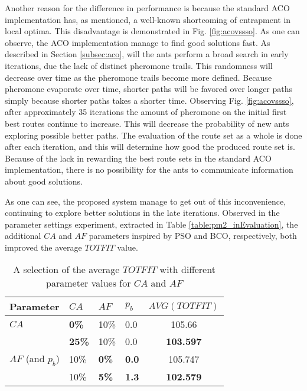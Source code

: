 Another reason for the difference in performance is because the standard ACO implementation has, as mentioned, a well-known shortcoming of entrapment in local optima. This disadvantage is demonstrated in Fig. \ref{fig:acovssso}. As one can observe, the ACO implementation manage to find good solutions fast. As described in Section \vref{subsec:aco}, will the ants perform a broad search in early iterations, due the lack of distinct pheromone trails. This randomness will decrease over time as the pheromone trails become more defined. Because pheromone evaporate over time, shorter paths will be favored over longer paths simply because shorter paths takes a shorter time. Observing Fig. \ref{fig:acovssso}, after approximately 35 iterations the amount of pheromone on the initial first best routes continue to increase. This will decrease the probability of new ants exploring possible better paths. The evaluation of the route set as a whole is done after each iteration, and this will determine how good the produced route set is. Because of the lack in rewarding the best route sets in the standard ACO implementation, there is no possibility for the ants to communicate information about good solutions.

As one can see, the proposed system manage to get out of this inconvenience, continuing to explore better solutions in the late iterations. Observed in the parameter settings experiment, extracted in Table \vref{table:pm2_inEvaluation}, the additional $CA$ and $AF$ parameters inspired by PSO and BCO, respectively, both improved the average $TOTFIT$ value. 

\begin{table}
    \centering
    \begin{tabular}{|l|l|l|l|c|}
    \hline
    Parameter & $CA$ & $AF$ & $p_b$ & $AVG(TOTFIT)$ \\
    \hline
    $CA$ & \textbf{0\%} & 10\% & 0.0 & 105.66\\
    ~ & \textbf{25\%} & 10\% & 0.0 & \textbf{103.597}\\
    \hline
    $AF$ (and $p_b$) & 10\% & \textbf{0\%} & \textbf{0.0} & 105.747 \\
    ~ & 10\% & \textbf{5\%} & \textbf{1.3} & \textbf{102.579}\\
    \hline
    \end{tabular}
    \caption {A selection of the average $TOTFIT$ with different parameter values for $CA$ and $AF$}
    \label{table:pm2_inEvaluation}
\end{table}

